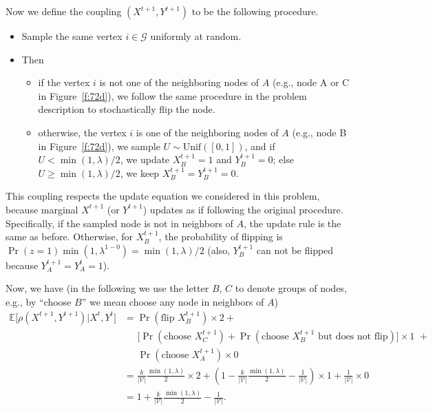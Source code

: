\documentclass{article}
\begin{document}
Now we define the coupling $(X^{t+1}, Y^{t+1})$ to be the following procedure.
\begin{itemize}
	\item Sample the same vertex $i \in \mathscr{G}$ uniformly at random. 
	\item Then
	\begin{itemize}
		\item if the vertex $i$ is not one of the neighboring nodes of $A$
(e.g., node A or C in Figure~\ref{f:72d}),
we follow the same procedure in the problem description to stochastically flip the node.
		\item otherwise, the vertex $i$ is one of the neighboring nodes of $A$
(e.g., node B in Figure~\ref{f:72d}), we sample $U \sim \text{Unif}([0, 1])$,
and if $U < \min(1, \lambda) / 2$, we update $X^{t+1}_B = 1$ and $Y^{t+1}_B = 0$;
else $U \geq \min(1, \lambda) / 2$, we keep $X^{t+1}_B = Y^{t+1}_B = 0$.
	\end{itemize}
\end{itemize}
%

This coupling respects the update equation we considered in this problem,
because marginal $X^{t+1}$ (or $Y^{t+1}$) updates as if following the original procedure.
Specifically, if the sampled node is not in neighbors of $A$, the update rule is the
same as before. Otherwise, for $X^{t+1}_B$, the probability of flipping is $\Pr(z=1)\min(1, \lambda^{1-0}) = \min(1, \lambda) / 2$ (also, $Y^{t+1}_B$ can not be flipped because $Y^{t+1}_A=Y^{t}_A=1$).

Now, we have (in the following we use the letter $B$, $C$ to denote groups of nodes, e.g., by ``choose $B$'' we mean choose any node in neighbors of $A$)
\begin{align*}
	\mathbb{E}\big[\rho(X^{t+1}, Y^{t+1}) | X^t, Y^t \big] &= \Pr(\text{flip $X^{t+1}_B$}) \times 2 + \\
	&\;\;\;\;\; \big[\Pr(\text{choose $X^{t+1}_C$}) + \Pr(\text{choose $X^{t+1}_B$ but does not flip})\big] \times 1 \,\, + \\
	&\;\;\;\;\; \Pr(\text{choose $X^{t+1}_A$}) \times 0 \\
	&= \frac{k}{|\mathscr{V}|}\frac{\min(1, \lambda)}{2} \times 2 + (1 - \frac{k}{|\mathscr{V}|}\frac{\min(1, \lambda)}{2} - \frac{1}{|\mathscr{V}|}) \times 1 + \frac{1}{|\mathscr{V}|} \times 0 \\
	& = 1 + \frac{k}{|\mathscr{V}|}\frac{\min(1, \lambda)}{2} - \frac{1}{|\mathscr{V}|}.
\end{align*}
\end{document}
